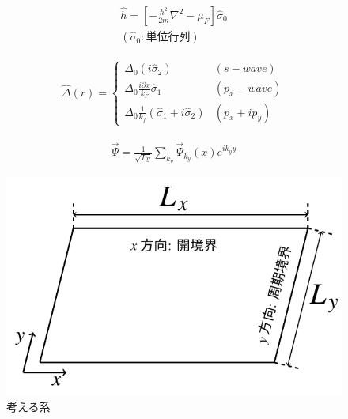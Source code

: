 \documentclass{jsarticle}
\begin{document}
		\begin{align}
			\hat{h}=\left[-\frac{\hbar^2}{2m}\nabla^2-\mu_F \right]\hat{\sigma}_0　\\
			\left( \hat{\sigma}_0:単位行列 \right)
		\end{align}

		\begin{align}
			\hat{\Delta}(r)=
			\begin{cases}
				\Delta_0 \left( i \hat{\sigma}_2 \right) & \left( s-wave \right) \\
				\Delta_0\frac{i\partial x}{k_F}\hat{\sigma}_1 & \left( p_x-wave \right) \\
				\Delta_0\frac{1}{k_f} \left( \hat{\sigma}_1+i\hat{\sigma}_2 \right) & \left( p_x+ip_y \right)
			\end{cases}
			\label{Delta}
		\end{align}

		\begin{align}
			\vec{\Psi}=\frac{1}{\sqrt{Ly}}\sum_{k_y} \vec{\Psi}_{k_y}(x) e^{ik_yy}
		\end{align}

		\begin{figure}[H]
			\centering
			\includegraphics[scale=1]{figure1}
			\caption{考える系}
			\label{system}
		\end{figure}
\end{document}

